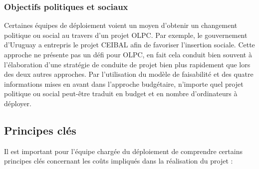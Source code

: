 \documentclass[12pt]{article}
\begin{document}
\subsubsection{Objectifs politiques et sociaux}
\label{sec-6-1-3}


Certaines équipes de déploiement voient un moyen d'obtenir un changement
politique ou social au travers d'un projet OLPC. Par exemple, le
gouvernement d'Uruguay a entrepris le projet CEIBAL afin de favoriser
l'insertion sociale. Cette approche ne présente pas un défi pour OLPC, en
fait cela conduit bien souvent à l'élaboration d'une stratégie de conduite
de projet bien plus rapidement que lors des deux autres approches. Par
l'utilisation du modèle de faisabilité et des quatre informations mises en
avant dans l'approche budgétaire, n'importe quel projet politique ou social
peut-être traduit en budget et en nombre d'ordinateurs à déployer.
\subsection{Principes clés}
\label{sec-6-2}


Il est important pour l'équipe chargée du déploiement de comprendre
certains principes clés concernant les coûts impliqués dans la réalisation du
projet :
\end{document}
